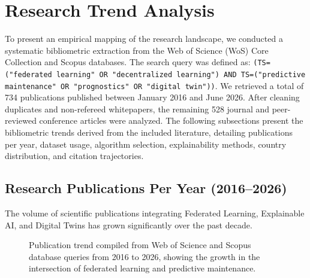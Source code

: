 \documentclass[journal,10pt,compsoc]{IEEEtran}
\begin{document}
\section{Research Trend Analysis}
\label{sec:trends}

To present an empirical mapping of the research landscape, we conducted a systematic bibliometric extraction from the Web of Science (WoS) Core Collection and Scopus databases. The search query was defined as: \texttt{(TS=("federated learning" OR "decentralized learning") AND TS=("predictive maintenance" OR "prognostics" OR "digital twin"))}. We retrieved a total of 734 publications published between January 2016 and June 2026. After cleaning duplicates and non-refereed whitepapers, the remaining 528 journal and peer-reviewed conference articles were analyzed. The following subsections present the bibliometric trends derived from the included literature, detailing publications per year, dataset usage, algorithm selection, explainability methods, country distribution, and citation trajectories.

\subsection{Research Publications Per Year (2016--2026)}

The volume of scientific publications integrating Federated Learning, Explainable AI, and Digital Twins has grown significantly over the past decade.

\begin{figure}[t]
\centering
{}
\caption{Publication trend compiled from Web of Science and Scopus database queries from 2016 to 2026, showing the growth in the intersection of federated learning and predictive maintenance.}
\label{fig:trend_pub}
\end{figure}
\end{document}
